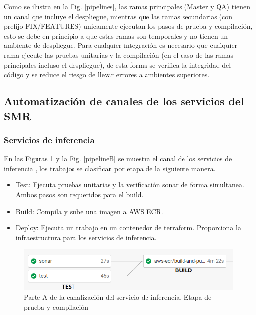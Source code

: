 Como se ilustra en la Fig. \ref{pipelines}, las ramas principales (Master y QA) tienen un canal que incluye el despliegue, mientras que las ramas secundarias (con prefijo FIX/FEATURES) unicamente ejecutan los pasos de prueba y compilación, esto se debe en principio a que estas ramas son temporales y no tienen un ambiente de despliegue. Para cualquier integración es necesario que cualquier rama ejecute las pruebas unitarias y la compilación (en el caso de las ramas principales incluso el despliegue), de esta forma se verifica la integridad del código y se reduce el riesgo de llevar errores a ambientes superiores.


\subsection {Automatización de canales de los servicios del SMR}

\subsubsection {Servicios de inferencia}

En las Figuras \ref {pipelineA} y la Fig. \ref{pipelineB} se muestra el canal de los servicios de inferencia \cite{EstebanInferencerAdapa2020}, los trabajos se clasifican por etapa de la siguiente manera.

\begin {itemize}
	\item Test: Ejecuta pruebas unitarias y la verificación sonar de forma simultanea. Ambos pasos son requeridos para el build.
	\item Build: Compila y sube una imagen a AWS ECR.
	\item Deploy: Ejecuta un trabajo en un contenedor de terraform. Proporciona la infraestructura para los servicios de inferencia.
\end {itemize}

\begin{figure}[H]
\centering
\includegraphics[width=0.8\linewidth]{bibliografia/Imagenes/inferencerpipelineA.PNG}
\caption {Parte A de la canalización del servicio de inferencia. Etapa de prueba y compilación}
\label {pipelineA}
\end {figure}

